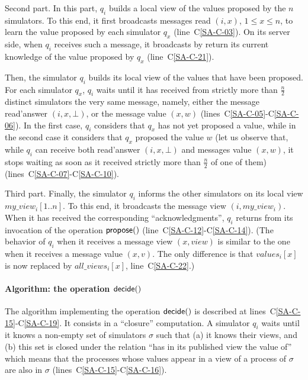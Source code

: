 \documentclass[11pt,letterpaper]{article}
\begin{document}
Second part. In this part, $q_i$  builds a local view of the values
proposed by the $n$ simulators. To this end, it first broadcasts  messages
{\sc read} $(i,x)$, $1 \leq x\leq n$, to learn the value proposed by
each simulator $q_x$   (line~C\ref{SA-C-03}). On its server side, when $q_i$
receives such a message, it broadcasts by return its current
knowledge of the value proposed by $q_x$  (line~C\ref{SA-C-21}).


Then, the  simulator $q_i$  builds its local view of the values that have been
proposed. For each simulator $q_x$, $q_i$ waits until it has received
from strictly more than $\frac{n}{2}$ distinct  simulators  the very 
same message, namely, either the message {\sc read'answer} $(i,x,\bot)$, 
or the message {\sc value} $(x,w)$   (lines~C\ref{SA-C-05}-C\ref{SA-C-06}).
In the first case, $q_i$  considers that $q_x$ has not yet proposed a value,
while in the second case it considers that  $q_x$  proposed the value $w$
(let us observe that, while $q_i$ can receive both {\sc read'answer} 
$(i,x,\bot)$ and messages  {\sc value} $(x,w)$, it stops waiting as soon as 
it received strictly more than $\frac{n}{2}$ of one of them) 
(lines~C\ref{SA-C-07}-C\ref{SA-C-10}). 

Third part. Finally, the simulator $q_i$  informs the other simulators
on its local view $my\_view_i[1..n]$. To this  end,  it broadcasts the message
{\sc view} $(i,my\_view_i)$. When it has received the corresponding
``acknowledgments'', $q_i$ returns from its invocation of the operation
${\sf propose}()$ (line~C\ref{SA-C-12}-C\ref{SA-C-14}).
(The behavior of  $q_i$ when it receives a message {\sc view} $(x,view)$
is similar to the one when it receives  a message {\sc value} $(x,v)$.
The only difference is that $values_i[x]$ is now replaced by
$all \_views_i[x]$, line~C\ref{SA-C-22}.)


\paragraph{Algorithm: the operation ${\sf decide}()$}
The algorithm implementing the operation ${\sf decide}()$ is described at
lines~C\ref{SA-C-15}-C\ref{SA-C-19}. It consists in a ``closure'' computation.
A simulator $q_i$ waits until it knows a non-empty set of simulators
$\sigma$  such that (a) it knows their views, and (b) this set is closed
under the relation ``has in its published view the value of'' which means
that the processes whose values appear in a view of a process of $\sigma$
are also in  $\sigma$ (lines~C\ref{SA-C-15}-C\ref{SA-C-16}).
\end{document}
